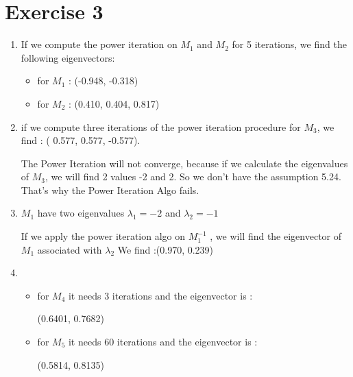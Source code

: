 
\section*{Exercise 3}

\begin{enumerate}[label=\alph*)]
    \item If we compute the power iteration on $M_{1}$ and $M_{2}$ for 5 iterations, we find the following eigenvectors:
\begin{itemize}
    \item for $M_{1}$ : (-0.948, -0.318)
    \item for $M_{2}$ : (0.410, 0.404, 0.817)
\end{itemize}
     \item if we compute three iterations of the power iteration procedure for $M_{3}$, we find : ( 0.577,  0.577, -0.577).
     
     The Power Iteration will not converge, because if we calculate the eigenvalues of $M_{3}$, we will find 2 values  -2 and 2. So we don't have the assumption 5.24. That's why the Power Iteration Algo fails.  
     \item  $M_{1}$ have two eigenvalues $\lambda_{1} = -2$ and $\lambda_{2} = -1$ 
     
     If we apply the power iteration algo on $M_{1}^{-1}$ , we will find the eigenvector of $M_{1}$ associated with $\lambda_{2}$ 
     We find :(0.970, 0.239)
     \item 
\begin{itemize}
    \item for $M_{4}$ it needs 3 iterations and the eigenvector is :
    
    (0.6401, 0.7682)
    \item for $M_{5}$ it needs 60 iterations and the eigenvector is   :
    
    (0.5814, 0.8135)
\end{itemize}
     
\end{enumerate}


